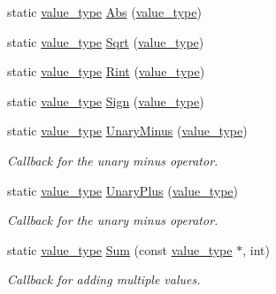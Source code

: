 \begin{DoxyCompactItemize}
\item 
static \hyperlink{namespacemu_a17d4f113a4b88b8d971cca8ddbbe8a47}{value\+\_\+type} \hyperlink{classmu_1_1_parser_ad266fff14e9ef1c885b9d58707f63de3}{Abs} (\hyperlink{namespacemu_a17d4f113a4b88b8d971cca8ddbbe8a47}{value\+\_\+type})
\item 
static \hyperlink{namespacemu_a17d4f113a4b88b8d971cca8ddbbe8a47}{value\+\_\+type} \hyperlink{classmu_1_1_parser_a1c3274e9af9301c6cd2fcd2899cf8d0f}{Sqrt} (\hyperlink{namespacemu_a17d4f113a4b88b8d971cca8ddbbe8a47}{value\+\_\+type})
\item 
static \hyperlink{namespacemu_a17d4f113a4b88b8d971cca8ddbbe8a47}{value\+\_\+type} \hyperlink{classmu_1_1_parser_a51134e691339d1f0eba2ef1401af9627}{Rint} (\hyperlink{namespacemu_a17d4f113a4b88b8d971cca8ddbbe8a47}{value\+\_\+type})
\item 
static \hyperlink{namespacemu_a17d4f113a4b88b8d971cca8ddbbe8a47}{value\+\_\+type} \hyperlink{classmu_1_1_parser_a5e40197030815bec2ed18e2515e2c4b5}{Sign} (\hyperlink{namespacemu_a17d4f113a4b88b8d971cca8ddbbe8a47}{value\+\_\+type})
\item 
static \hyperlink{namespacemu_a17d4f113a4b88b8d971cca8ddbbe8a47}{value\+\_\+type} \hyperlink{classmu_1_1_parser_abead8f768bebfaf07b4f7dc240f6b3e8}{Unary\+Minus} (\hyperlink{namespacemu_a17d4f113a4b88b8d971cca8ddbbe8a47}{value\+\_\+type})
\begin{DoxyCompactList}\small\item\em Callback for the unary minus operator. \end{DoxyCompactList}\item 
static \hyperlink{namespacemu_a17d4f113a4b88b8d971cca8ddbbe8a47}{value\+\_\+type} \hyperlink{classmu_1_1_parser_a81a6e9b2085c3ccacb43f26f5c88931c}{Unary\+Plus} (\hyperlink{namespacemu_a17d4f113a4b88b8d971cca8ddbbe8a47}{value\+\_\+type})
\begin{DoxyCompactList}\small\item\em Callback for the unary minus operator. \end{DoxyCompactList}\item 
static \hyperlink{namespacemu_a17d4f113a4b88b8d971cca8ddbbe8a47}{value\+\_\+type} \hyperlink{classmu_1_1_parser_aee609940958bf761b4df615576e98d0a}{Sum} (const \hyperlink{namespacemu_a17d4f113a4b88b8d971cca8ddbbe8a47}{value\+\_\+type} $\ast$, int)
\begin{DoxyCompactList}\small\item\em Callback for adding multiple values. \end{DoxyCompactList}\item 

\end{DoxyCompactItemize}
